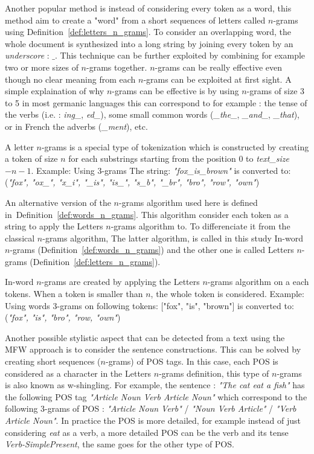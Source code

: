 Another popular method is instead of considering every token as a word, this method aim to create a "word" from a short sequences of letters called $n$-grams using Definition~\ref{def:letters_n_grams}.
To consider an overlapping word, the whole document is synthesized into a long string by joining every token by an \textit{underscore} : $\_$.
This technique can be further exploited by combining for example two or more sizes of $n$-grams together.
$n$-grams can be really effective even though no clear meaning from each $n$-grams can be exploited at first sight.
A simple explaination of why $n$-grams can be effective is by using $n$-grams of size 3 to 5 in most germanic languages this can correspond to for example : the tense of the verbs (i.e. : \textit{ing\_}, \textit{ed\_}), some small common words (\textit{\_the\_}, \textit{\_and\_}, \textit{\_that}), or in French the adverbs (\textit{\_ment}), etc.

\begin{definition}
  \label{def:letters_n_grams}
  A letter $n$-grams is a special type of tokenization which is constructed by creating a token of size $n$ for each substrings starting from the position $0$ to \textit{text\_size} $- n - 1$.
  Example: Using 3-grams The string: \textit{"fox\_is\_brown"} is converted to: (\textit{"fox", "ox\_", "x\_i", "\_is", "is\_", "s\_b", "\_br", "bro", "row", "own"})
\end{definition}

An alternative version of the $n$-grams algorithm used here is defined in~Definition~\ref{def:words_n_grams}.
This algorithm consider each token as a string to apply the Letters $n$-grams algorithm to.
To differenciate it from the classical $n$-grams algorithm,
The latter algorithm, is called in this study In-word $n$-grams (Definition~\ref{def:words_n_grams}) and the other one is  called Letters $n$-grams (Definition~\ref{def:letters_n_grams}).

\begin{definition}
  \label{def:words_n_grams}
  In-word $n$-grams are created by applying the Letters $n$-grams algorithm on a each tokens.
  When a token is smaller than $n$, the whole token is considered.
  Example: Using words 3-grams on following tokens: ["fox", "is", "brown"] is converted to: (\textit{"fox", "is", "bro", "row, "own"})
\end{definition}

Another possible stylistic aspect that can be detected from a text using the MFW approach is to consider the sentence constructions.
This can be solved by creating short sequences ($n$-grams) of POS tags.
In this case, each POS is considered as a character in the Letters $n$-grams definition, this type of $n$-grams is also known as w-shingling.
For example, the sentence : \textit{"The cat eat a fish"} has the following POS tag \textit{"Article Noun Verb Article Noun"} which correspond to the following 3-grams of POS : \textit{"Article Noun Verb"} / \textit{"Noun Verb Article"} / \textit{"Verb Article Noun"}.
In practice the POS is more detailed, for example instead of just considering \textit{eat} as a verb, a more detailed POS can be the verb and its tense \textit{Verb-SimplePresent}, the same goes for the other type of POS.

